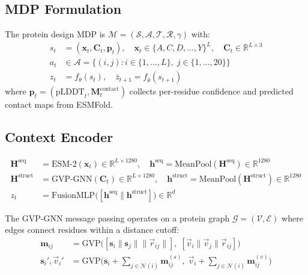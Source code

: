\documentclass[12pt, a4paper]{article}
\begin{document}
\subsection{MDP Formulation}

The protein design MDP is $\mathcal{M} = (\mathcal{S}, \mathcal{A}, \mathcal{T}, \mathcal{R}, \gamma)$ with:
\begin{align}
    s_t &= (\mathbf{x}_t, \mathbf{C}_t, \mathbf{p}_t), \quad \mathbf{x}_t \in \{A, C, D, \ldots, Y\}^L, \quad \mathbf{C}_t \in \mathbb{R}^{L \times 3} \\
    a_t &\in \mathcal{A} = \{(i, j) : i \in \{1,\ldots,L\},\; j \in \{1,\ldots,20\}\} \\
    z_t &= f_\theta(s_t), \quad \bar{z}_{t+1} = f_{\bar{\theta}}(s_{t+1})
\end{align}
\noindent where $\mathbf{p}_t = (\text{pLDDT}_t, \mathbf{M}^\text{contact}_t)$ collects per-residue confidence and predicted contact maps from ESMFold.

\subsection{Context Encoder}

\begin{align}
    \mathbf{H}^\text{seq} &= \text{ESM-2}(\mathbf{x}_t) \in \mathbb{R}^{L \times 1280}, \quad \mathbf{h}^\text{seq} = \text{MeanPool}(\mathbf{H}^\text{seq}) \in \mathbb{R}^{1280} \\
    \mathbf{H}^\text{struct} &= \text{GVP-GNN}(\mathbf{C}_t) \in \mathbb{R}^{L \times 1280}, \quad \mathbf{h}^\text{struct} = \text{MeanPool}(\mathbf{H}^\text{struct}) \in \mathbb{R}^{1280} \\
    z_t &= \text{FusionMLP}\big([\mathbf{h}^\text{seq} \| \mathbf{h}^\text{struct}]\big) \in \mathbb{R}^d
\end{align}

\noindent The GVP-GNN message passing operates on a protein graph $\mathcal{G} = (\mathcal{V}, \mathcal{E})$ where edges connect residues within a distance cutoff:
\begin{align}
    \mathbf{m}_{ij} &= \text{GVP}\Big([\mathbf{s}_i \| \mathbf{s}_j \| \|\vec{r}_{ij}\|],\; [\vec{v}_i \| \vec{v}_j \| \vec{r}_{ij}]\Big) \\
    \mathbf{s}_i', \vec{v}_i' &= \text{GVP}\Big(\mathbf{s}_i + \textstyle\sum_{j \in \mathcal{N}(i)} \mathbf{m}_{ij}^{(s)},\; \vec{v}_i + \textstyle\sum_{j \in \mathcal{N}(i)} \mathbf{m}_{ij}^{(v)}\Big)
\end{align}
\end{document}
